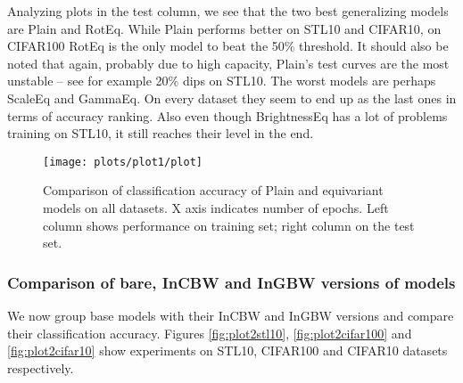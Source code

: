     Analyzing plots in the test column, we see that the two best generalizing
    models are Plain and RotEq. While Plain performs better on STL10 and
    CIFAR10, on CIFAR100 RotEq is the only model to beat the 50\% threshold.
    It should also be noted that again, probably due to high capacity, Plain's
    test curves are the most unstable -- see for example 20\% dips on STL10.
    The worst models are perhaps ScaleEq and GammaEq. On every dataset they seem
    to end up as the last ones in terms of accuracy ranking.
    Also even though BrightnessEq has a lot of problems training on STL10, it
    still reaches their level in the end.

    \begin{figure}[h!]
        \centering
        \texttt{[image: plots/plot1/plot]}
        \caption{Comparison of classification accuracy of
            Plain and equivariant models on all datasets. X axis indicates
            number of epochs. Left column shows performance on training set;
        right column on the test set.}
        \label{fig:plot1}
    \end{figure}

    \clearpage
    \subsubsection*{Comparison of bare, InCBW and InGBW versions of models}
    We now group base models with their InCBW and InGBW versions and compare
    their classification accuracy. Figures
    \ref{fig:plot2stl10}, \ref{fig:plot2cifar100} and \ref{fig:plot2cifar10}
    show experiments on STL10, CIFAR100 and CIFAR10 datasets respectively.


